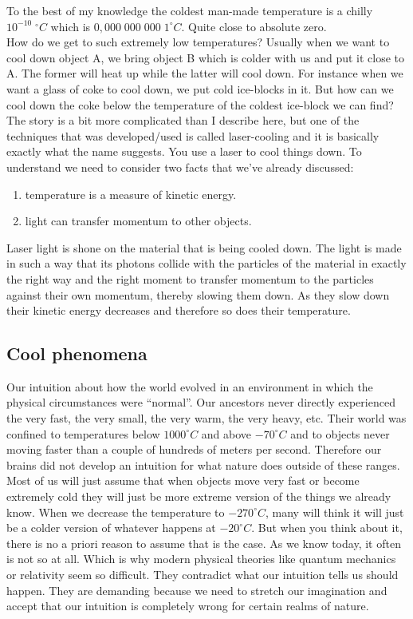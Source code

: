 \noindent To the best of my knowledge the coldest man-made temperature is a chilly $10^{-10}\; ^{\circ} C$ which is $0,000 \; 000 \; 000 \; 1^{\circ} C$. Quite close to absolute zero.\\

\noindent How do we get to such extremely low temperatures? Usually when we want to cool down object A, we bring object B which is colder with us and put it close to A. The former will heat up while the latter will cool down. For instance when we want a glass of coke to cool down, we put cold ice-blocks in it. But how can we cool down the coke below the temperature of the coldest ice-block we can find? The story is a bit more complicated than I describe here, but one of the techniques that was developed/used is called laser-cooling and it is basically exactly what the name suggests. You use a laser to cool things down. To understand we need to consider two facts that we've already discussed: 
\begin{enumerate}
\item temperature is a measure of kinetic energy.
\item light can transfer momentum to other objects.
\end{enumerate}
Laser light is shone on the material that is being cooled down. The light is made in such a way that its photons collide with the particles of the material in exactly the right way and the right moment to transfer momentum to the particles against their own momentum, thereby slowing them down. As they slow down their kinetic energy decreases and therefore so does their temperature.

\subsection{Cool phenomena}

\noindent Our intuition about how the world evolved in an environment in which the physical circumstances were "`normal"'. Our ancestors never directly experienced the very fast, the very small, the very warm, the very heavy, etc. Their world was confined to temperatures below $1000^{\circ} C$ and above $-70^{\circ} C$ and to objects never moving faster than a couple of hundreds of meters per second. Therefore our brains did not develop an intuition for what nature does outside of these ranges. Most of us will just assume that when objects move very fast or become extremely cold they will just be more extreme version of the things we already know. When we decrease the temperature to $-270^{\circ} C$, many will think it will just be a colder version of whatever happens at $-20^{\circ}C$. But when you think about it, there is no a priori reason to assume that is the case. As we know today, it often is not so at all. Which is why modern physical theories like quantum mechanics or relativity seem so difficult. They contradict what our intuition tells us should happen. They are demanding because we need to stretch our imagination and accept that our intuition is completely wrong for certain realms of nature.\\

